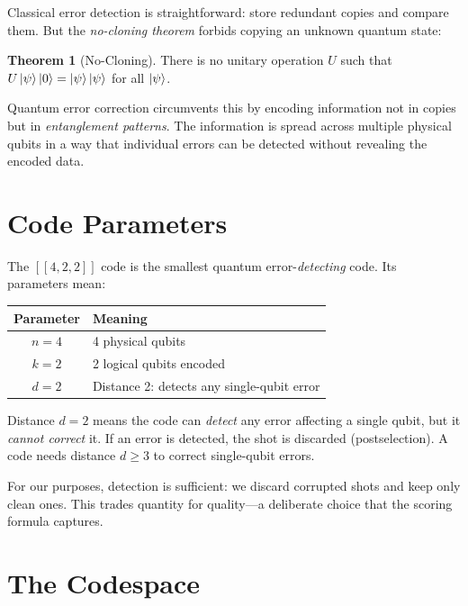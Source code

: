 \documentclass[11pt,a4paper,twoside]{report}
\theoremstyle{definition}
\newtheorem{theorem}{Theorem}[chapter]
\begin{document}
Classical error detection is straightforward: store redundant copies and
compare them. But the \emph{no-cloning theorem} forbids copying an
unknown quantum state:

\begin{theorem}[No-Cloning]
There is no unitary operation $U$ such that
$U\ket{\psi}\ket{0} = \ket{\psi}\ket{\psi}$ for all $\ket{\psi}$.
\end{theorem}

Quantum error correction circumvents this by encoding information not
in copies but in \emph{entanglement patterns}. The information is spread
across multiple physical qubits in a way that individual errors can be
detected without revealing the encoded data.

\section{Code Parameters}

The $[\![4,2,2]\!]$ code is the smallest quantum error-\emph{detecting}
code. Its parameters mean:

\begin{center}
\renewcommand{\arraystretch}{1.3}
\begin{tabular}{cl}
\toprule
\textbf{Parameter} & \textbf{Meaning} \\
\midrule
$n = 4$ & 4 physical qubits \\
$k = 2$ & 2 logical qubits encoded \\
$d = 2$ & Distance 2: detects any single-qubit error \\
\bottomrule
\end{tabular}
\end{center}

\begin{concept}[title={Detection vs.\ Correction}]
Distance $d = 2$ means the code can \emph{detect} any error affecting
a single qubit, but it \emph{cannot correct} it. If an error is
detected, the shot is discarded (postselection). A code needs
distance $d \geq 3$ to correct single-qubit errors.
\end{concept}

For our purposes, detection is sufficient: we discard corrupted shots
and keep only clean ones. This trades quantity for quality---a deliberate
choice that the scoring formula captures.

\section{The Codespace}
\end{document}
